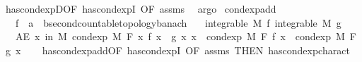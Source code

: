 \begin{isabellebody}
%
\isatagproof
{}\isamarkupfalse%
\ has{\isacharunderscore}{\kern0pt}cond{\isacharunderscore}{\kern0pt}expD{\isacharparenleft}{\kern0pt}{}{\isacharparenright}{\kern0pt}{\isacharbrackleft}{\kern0pt}OF\ has{\isacharunderscore}{\kern0pt}cond{\isacharunderscore}{\kern0pt}expI{\isacharcomma}{\kern0pt}\ OF\ assms{\isacharbrackright}{\kern0pt}\ \isamarkupfalse%
\ argo%
\endisatagproof
{\isafoldproof}%
%
\isadelimproof
\isanewline
%
\endisadelimproof
\isanewline
{}\isamarkupfalse%
\ cond{\isacharunderscore}{\kern0pt}exp{\isacharunderscore}{\kern0pt}add{\isacharcolon}{\kern0pt}\isanewline
\ \ \ f\ {\isacharcolon}{\kern0pt}{\isacharcolon}{\kern0pt}\ {\isachardoublequoteopen}{\isacharprime}{\kern0pt}a\ {\isasymRightarrow}\ {\isacharprime}{\kern0pt}b{\isacharcolon}{\kern0pt}{\isacharcolon}{\kern0pt}{\isacharbraceleft}{\kern0pt}second{\isacharunderscore}{\kern0pt}countable{\isacharunderscore}{\kern0pt}topology{\isacharcomma}{\kern0pt}banach{\isacharbraceright}{\kern0pt}{\isachardoublequoteclose}\isanewline
\ \ \ {\isachardoublequoteopen}integrable\ M\ f{\isachardoublequoteclose}\ {\isachardoublequoteopen}integrable\ M\ g{\isachardoublequoteclose}\isanewline
\ \ \ {\isachardoublequoteopen}AE\ x\ in\ M{\isachardot}{\kern0pt}\ cond{\isacharunderscore}{\kern0pt}exp\ M\ F\ {\isacharparenleft}{\kern0pt}{\isasymlambda}x{\isachardot}{\kern0pt}\ f\ x\ {\isacharplus}{\kern0pt}\ g\ x{\isacharparenright}{\kern0pt}\ x\ {\isacharequal}{\kern0pt}\ cond{\isacharunderscore}{\kern0pt}exp\ M\ F\ f\ x\ {\isacharplus}{\kern0pt}\ cond{\isacharunderscore}{\kern0pt}exp\ M\ F\ g\ x{\isachardoublequoteclose}\isanewline
%
\isadelimproof
\ \ %
\endisadelimproof
%
\isatagproof
{}\isamarkupfalse%
\ has{\isacharunderscore}{\kern0pt}cond{\isacharunderscore}{\kern0pt}exp{\isacharunderscore}{\kern0pt}add{\isacharbrackleft}{\kern0pt}OF\ has{\isacharunderscore}{\kern0pt}cond{\isacharunderscore}{\kern0pt}expI{\isacharparenleft}{\kern0pt}{}{\isacharcomma}{\kern0pt}{}{\isacharparenright}{\kern0pt}{\isacharcomma}{\kern0pt}\ OF\ assms{\isacharcomma}{\kern0pt}\ THEN\ has{\isacharunderscore}{\kern0pt}cond{\isacharunderscore}{\kern0pt}exp{\isacharunderscore}{\kern0pt}charact{\isacharparenleft}{\kern0pt}{}{\isacharparenright}{\kern0pt}{\isacharbrackright}{\kern0pt}\ \isacommand{{\isachardot}{\kern0pt}}\isamarkupfalse%
%
\endisatagproof
{\isafoldproof}%
%
\isadelimproof
\isanewline
%
\endisadelimproof
\isanewline
{}\isamarkupfalse%

\end{isabellebody}
